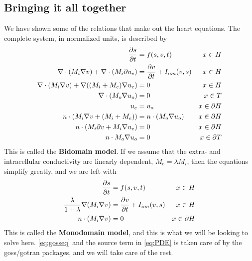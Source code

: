 \subsection{Bringing it all together}
We have shown some of the relations that make out the heart equations. The complete system, in normalized units, is described by 
\begin{align}
 {\partial s \over \partial t} &= f(s,v,t) & x \in H \\
 \nabla \cdot (M_i \nabla v) + \nabla \cdot (M_i \partial u_e) &= {\partial v \over \partial t} + I_{ion}(v,s) & x \in H \\
 \nabla \cdot (M_i \nabla v) + \nabla((M_i + M_e) \nabla u_e) & = 0 & x \in H \\
 \nabla \cdot (M_o \nabla u_o) &= 0 & x\in T \\
 u_e &= u_o & x \in \partial H \\ 
 n \cdot (M_i \nabla v + (M_i + M_e)) &= n\cdot (M_o \nabla u_o) & x \in \partial H \\
 n \cdot (M_i \partial v + M_i \nabla u_e) & = 0 & x \in \partial H \\
 n \cdot M_o \nabla u_o & = 0 & x\in \partial T 
\end{align}
This is called the \textbf{Bidomain model}. If we assume that the extra- and intracellular conductivity are linearly dependent, $M_e = \lambda M_i$, then the equations simplify greatly, and we are left with 
\begin{align}
 {\partial s \over \partial t} &= f(s,v,t) & x \in H \label{eq:gosseq}\\
 {\lambda \over 1 + \lambda} \nabla (M_i \nabla v)& = {\partial v \over \partial t} + I_{ion}(v,s) & x\in H  \label{eq:PDE}\\ 
 n \cdot (M_i \nabla v) &= 0 & x\in \partial H \label{eq:BND}
\end{align}
This is called the \textbf{Monodomain model}, and this is what we will be looking to solve here. \eqref{eq:gosseq} and the source term in \eqref{eq:PDE} is taken care of by the goss/gotran packages, and we will take care of the rest. 

